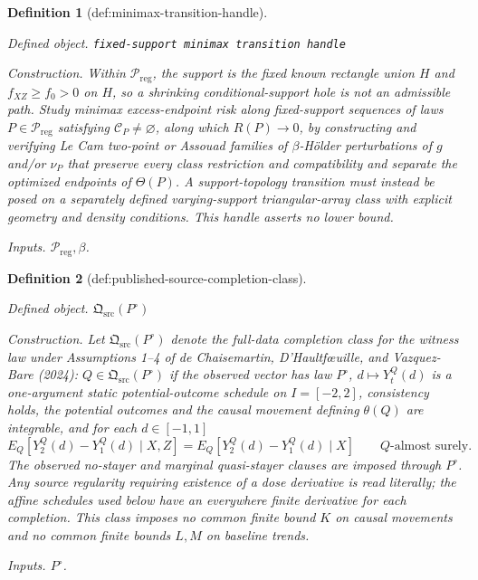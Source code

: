 \documentclass{article}
\newtheorem{definition}{Definition}
\begin{document}
\begin{definition}[def:minimax-transition-handle]\label{def:minimax-transition-handle}
\par\smallskip\noindent\emph{Defined object.} \texttt{fixed-\allowbreak{}support minimax transition handle}
\par\smallskip\noindent\emph{Construction.} Within \(\mathcal P_{\mathrm{reg}}\), the support is the fixed known rectangle union \(H\) and \(f_{XZ}\ge f_0>0\) on \(H\), so a shrinking conditional-support hole is not an admissible path. Study minimax excess-endpoint risk along fixed-support sequences of laws \(P\in\mathcal P_{\mathrm{reg}}\) satisfying \(\mathcal C_P\neq\varnothing\), along which \(R(P)\to0\), by constructing and verifying Le Cam two-point or Assouad families of \(\beta\)-H\"older perturbations of \(g\) and/or \(\nu_P\) that preserve every class restriction and compatibility and separate the optimized endpoints of \(\Theta(P)\). A support-topology transition must instead be posed on a separately defined varying-support triangular-array class with explicit geometry and density conditions. This handle asserts no lower bound.
\par\smallskip\noindent\emph{Inputs.} \(\mathcal P_{\mathrm{reg}},\beta\).
\end{definition}

\begin{definition}[def:published-source-completion-class]\label{def:published-source-completion-class}
\par\smallskip\noindent\emph{Defined object.} \(\mathfrak Q_{\mathrm{src}}(P^{\circ})\)
\par\smallskip\noindent\emph{Construction.} Let \(\mathfrak Q_{\mathrm{src}}(P^{\circ})\) denote the full-data completion class for the witness law under Assumptions 1--4 of de Chaisemartin, D'Haultf\oe{}uille, and Vazquez-Bare (2024): \(Q\in\mathfrak Q_{\mathrm{src}}(P^{\circ})\) if the observed vector has law \(P^{\circ}\), \(d\mapsto Y_t^Q(d)\) is a one-argument static potential-outcome schedule on \(I=[-2,2]\), consistency holds, the potential outcomes and the causal movement defining \(\theta(Q)\) are integrable, and for each \(d\in[-1,1]\)
\[
E_Q[Y_2^Q(d)-Y_1^Q(d)\mid X,Z]
=E_Q[Y_2^Q(d)-Y_1^Q(d)\mid X]
\qquad Q\text{-almost surely}.
\]
The observed no-stayer and marginal quasi-stayer clauses are imposed through \(P^{\circ}\). Any source regularity requiring existence of a dose derivative is read literally; the affine schedules used below have an everywhere finite derivative for each completion. This class imposes no common finite bound \(K\) on causal movements and no common finite bounds \(L,M\) on baseline trends.
\par\smallskip\noindent\emph{Inputs.} \(P^{\circ}\).
\end{definition}
\end{document}
